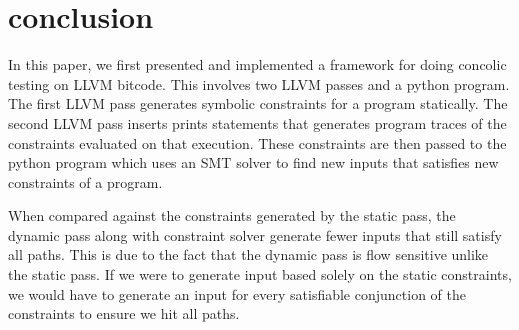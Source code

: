 \section{conclusion}
In this paper, we first presented and implemented a framework for doing concolic testing on LLVM bitcode. This involves two LLVM passes and a python program. The first LLVM pass
generates symbolic constraints for a program statically. The second LLVM pass inserts prints statements that generates program traces of the constraints evaluated on that
execution. These constraints are then passed to the python program which uses an SMT solver to find new inputs that satisfies new constraints of a program.

When compared against the constraints generated by the static pass, the dynamic pass along with constraint solver generate fewer inputs that still satisfy all paths. This
is due to the fact that the dynamic pass is flow sensitive unlike the static pass. If we were to generate input based solely on the static constraints, we would have to generate an
input for every satisfiable conjunction of the constraints to ensure we hit all paths. 